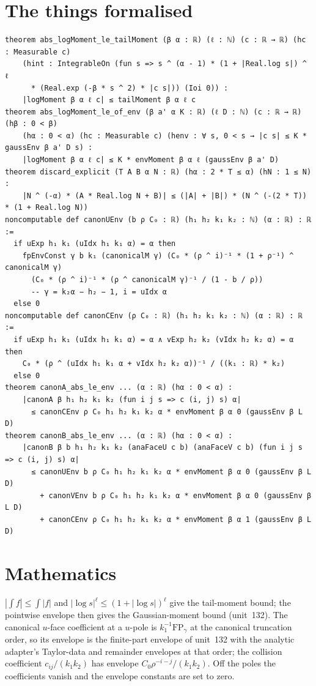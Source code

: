 \documentclass[11pt]{article}
\begin{document}
\section{The things formalised}
{\small
\begin{verbatim}
theorem abs_logMoment_le_tailMoment (β α : ℝ) (ℓ : ℕ) (c : ℝ → ℝ) (hc : Measurable c)
    (hint : IntegrableOn (fun s => s ^ (α - 1) * (1 + |Real.log s|) ^ ℓ
      * (Real.exp (-β * s ^ 2) * |c s|)) (Ioi 0)) :
    |logMoment β α ℓ c| ≤ tailMoment β α ℓ c
theorem abs_logMoment_le_of_env (β a' α K : ℝ) (ℓ D : ℕ) (c : ℝ → ℝ) (hβ : 0 < β)
    (hα : 0 < α) (hc : Measurable c) (henv : ∀ s, 0 < s → |c s| ≤ K * gaussEnv β a' D s) :
    |logMoment β α ℓ c| ≤ K * envMoment β α ℓ (gaussEnv β a' D)
theorem discard_explicit (T A B α N : ℝ) (hα : 2 * T ≤ α) (hN : 1 ≤ N) :
    |N ^ (-α) * (A * Real.log N + B)| ≤ (|A| + |B|) * (N ^ (-(2 * T)) * (1 + Real.log N))
noncomputable def canonUEnv (b ρ C₀ : ℝ) (h₁ h₂ k₁ k₂ : ℕ) (α : ℝ) : ℝ :=
  if uExp h₁ k₁ (uIdx h₁ k₁ α) = α then
    fpEnvConst γ b k₁ (canonicalM γ) (C₀ * (ρ ^ i)⁻¹ * (1 + ρ⁻¹) ^ canonicalM γ)
      (C₀ * (ρ ^ i)⁻¹ * (ρ ^ canonicalM γ)⁻¹ / (1 - b / ρ))
      -- γ = k₂α − h₂ − 1, i = uIdx α
  else 0
noncomputable def canonCEnv (ρ C₀ : ℝ) (h₁ h₂ k₁ k₂ : ℕ) (α : ℝ) : ℝ :=
  if uExp h₁ k₁ (uIdx h₁ k₁ α) = α ∧ vExp h₂ k₂ (vIdx h₂ k₂ α) = α then
    C₀ * (ρ ^ (uIdx h₁ k₁ α + vIdx h₂ k₂ α))⁻¹ / ((k₁ : ℝ) * k₂)
  else 0
theorem canonA_abs_le_env ... (α : ℝ) (hα : 0 < α) :
    |canonA β h₁ h₂ k₁ k₂ (fun i j s => c (i, j) s) α|
      ≤ canonCEnv ρ C₀ h₁ h₂ k₁ k₂ α * envMoment β α 0 (gaussEnv β L D)
theorem canonB_abs_le_env ... (α : ℝ) (hα : 0 < α) :
    |canonB β b h₁ h₂ k₁ k₂ (anaFaceU c b) (anaFaceV c b) (fun i j s => c (i, j) s) α|
      ≤ canonUEnv b ρ C₀ h₁ h₂ k₁ k₂ α * envMoment β α 0 (gaussEnv β L D)
        + canonVEnv b ρ C₀ h₁ h₂ k₁ k₂ α * envMoment β α 0 (gaussEnv β L D)
        + canonCEnv ρ C₀ h₁ h₂ k₁ k₂ α * envMoment β α 1 (gaussEnv β L D)
\end{verbatim}
}

\section{Mathematics}

$|\int f|\le\int|f|$ and $|\log s|^\ell\le(1+|\log s|)^\ell$ give the tail-moment bound; the
pointwise envelope then gives the Gaussian-moment bound (unit~132). The canonical $u$-face
coefficient at a $u$-pole is $k_1^{-1}\mathrm{FP}_\gamma$ at the canonical truncation order, so its
envelope is the finite-part envelope of unit~132 with the analytic adapter's Taylor-data and
remainder envelopes at that order; the collision coefficient $c_{ij}/(k_1k_2)$ has envelope
$C_0\rho^{-i-j}/(k_1k_2)$. Off the poles the coefficients vanish and the envelope constants are set
to zero.
\end{document}
